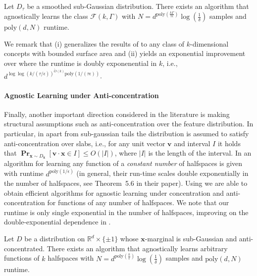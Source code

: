 \documentclass{theoretics}
\renewcommand\vec[1]{\mathbf{#1}}
\DeclareMathOperator*{\pr}{\mathbf{Pr}}
\newcommand{\R}{\mathbb{R}}
\newcommand{\eps}{\epsilon}
\newcommand{\poly}{\mathrm{poly}}
\newcommand{\1}{\Ind}
\newcommand{\wt}{\widetilde}
\newcommand{\x}{\vec x}
\begin{document}
\begin{corollary}
\label{intro-cor:smoothed-distributions}
Let $D_\tau$ be a smoothed sub-Gaussian distribution.   
There exists an algorithm that agnostically learns the class $\mathcal F(k, \Gamma)$ 
with $N = d^{\poly(\frac{k\Gamma}{\tau \epsilon})}\log(\frac{1}{\delta})$ samples and $\poly(d,N)$ runtime.
\end{corollary}

We remark that  (i) generalizes the results of 
\cite{Kane2013LearningHalfspacesLogConcave} to any class of $k$-dimensional concepts with bounded surface area and (ii) yields an exponential improvement over \cite{Kane2013LearningHalfspacesLogConcave} where the runtime is doubly exponenential in $k$, i.e., $d^{\log \log(k/(\tau/\eps))^{\wt{O}(k)} \poly(1/(\tau \eps))}$. 


\paragraph{Agnostic Learning under Anti-concentration}
Finally, another important direction considered in the literature is making structural
assumptions such as anti-concentration over the feature distribution.
In particular, in \cite{gollakota_testable} apart from sub-gaussian tails the distribution
is assumed to satisfy anti-concentration over slabs, i.e., for any unit vector $\vec v$ and interval $I$ it holds that $\pr_{\x \sim D_\x}[\vec v \cdot \x \in I] \leq O(|I|)$, where $|I|$
is the length of the interval.  In \cite{gollakota_testable} an algorithm for learning
any function of a \emph{constant number} of halfspaces is given with runtime $d^{\poly(1/\eps)}$ (in general, their run-time scales double exponentially in the number of halfspaces, see Theorem~5.6 in their paper).
Using  we are able to obtain efficient algorithms for agnostic learning under concentration and anti-concentration for functions of any number of halfspaces. We note that our runtime is only single exponential in the number of halfspaces, improving on the double-exponential dependence in \cite{gollakota_testable}. 

\begin{corollary}
Let $D$ be a distribution on $\R^d \times \{\pm 1\}$ whose $\x$-marginal is sub-Gaussian
and anti-concentrated.
There exists an algorithm that agnostically learns arbitrary functions of $k$ halfspaces
 with $N = d^{\poly(\frac{k}{\epsilon})}\log(\frac{1}{\delta})$ samples and $\poly(d,N)$ runtime.
\end{corollary}
\end{document}
